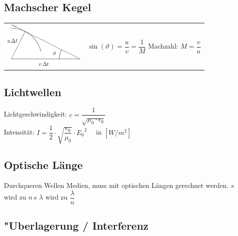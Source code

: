 \begin{minipage}{10cm}
	\subsection{Machscher Kegel  }
	\begin{tabular}{ll}
	\parbox{5cm}{
		\includegraphics[width=4cm]{./bilder/machscher-kegel.png}}
		& 
		\parbox{5cm}{$\sin(\vartheta)=\dfrac{u}{v} = \dfrac{1}{M}$ \\ \\
		Machzahl: $M=\dfrac{v}{u}$}
	\end{tabular}
\end{minipage}
\begin{minipage}{8cm}
	\subsection{Lichtwellen}
		Lichtgeschwindigkeit: $ c = \dfrac{1}{\sqrt{\mu_0 \cdot \epsilon_0}} \qquad \qquad$ \\
		Intensität: $I = \dfrac{1}{2} \cdot \sqrt{\dfrac{\epsilon_0}{\mu_0}} \cdot {E_0}^2 \quad$ in $[W/m^2]$
\end{minipage}


\subsection{Optische Länge}
Durchqueren Wellen Medien, muss mit optischen Längen gerechnet werden.\qquad 
$s$ wird zu $n\,s$ \qquad $\lambda$ wird zu $\dfrac{\lambda}{n}$



\subsection{"Uberlagerung / Interferenz  }
\setlength{\tabcolsep}{5pt}
\renewcommand{\arraystretch}{2}
